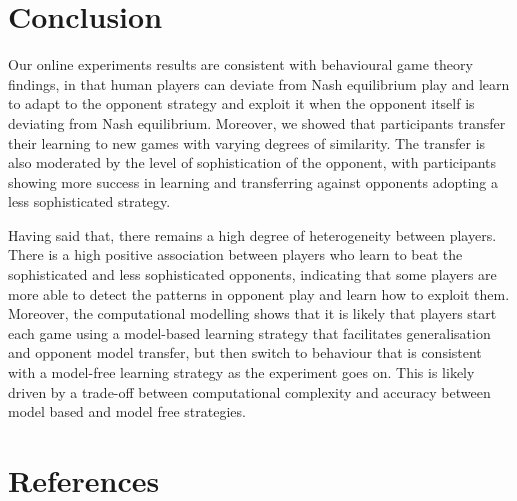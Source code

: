 \documentclass[man,floatsintext]{apa6}
\begin{document}
\newpage

\hypertarget{conclusion}{%
\section{Conclusion}\label{conclusion}}

Our online experiments results are consistent with behavioural game theory findings, in that human players can deviate from Nash equilibrium play and learn to adapt to the opponent strategy and exploit it when the opponent itself is deviating from Nash equilibrium. Moreover, we showed that participants transfer their learning to new games with varying degrees of similarity. The transfer is also moderated by the level of sophistication of the opponent, with participants showing more success in learning and transferring against opponents adopting a less sophisticated strategy.

Having said that, there remains a high degree of heterogeneity between players. There is a high positive association between players who learn to beat the sophisticated and less sophisticated opponents, indicating that some players are more able to detect the patterns in opponent play and learn how to exploit them. Moreover, the computational modelling shows that it is likely that players start each game using a model-based learning strategy that facilitates generalisation and opponent model transfer, but then switch to behaviour that is consistent with a model-free learning strategy as the experiment goes on. This is likely driven by a trade-off between computational complexity and accuracy between model based and model free strategies.
\newpage

\hypertarget{references}{%
\section{References}\label{references}}

\begingroup
\setlength{\parindent}{-0.5in}
\setlength{\leftskip}{0.5in}

\hypertarget{refs}{}

\endgroup
\end{document}
